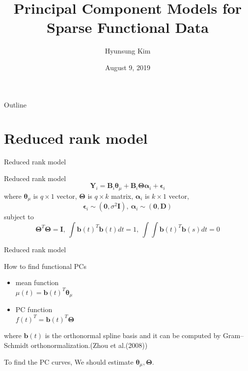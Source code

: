 \documentclass{beamer}
\title{Principal Component Models for Sparse Functional Data}
\date[Short Occasion]{August 9, 2019}
\author{Hyunsung Kim}
\institute{Department of Statistics\\ Chung-Ang University}
\subtitle{}
\def \bY {\mathbf{Y}}
\def \btheta {\boldsymbol{\theta}}
\def \bTheta {\boldsymbol{\Theta}}
\def \bepsilon {\boldsymbol{\epsilon}}
\def \balpha {\boldsymbol{\alpha}}
\begin{document}
\begin{frame}
  \titlepage
\end{frame}

\begin{frame}{Outline}
  \tableofcontents
\end{frame}

\section{Reduced rank model}
\begin{frame}{Reduced rank model}
	\begin{block}{Reduced rank model}
	\vspace{0.1cm}
	$$ \bY_i=\mathbf{B}_i\btheta_{\mu}+\mathbf{B}_i\bTheta\balpha_i + \bepsilon_i $$
	where $\btheta_{\mu}$ is $q \times 1$ vector, $\bTheta$ is $ q \times k$ matrix, $\balpha_i$ is $k \times 1$ vector,
	$$ \bepsilon_i \sim (\mathbf{0}, \sigma^2 \mathbf{I}), \ \balpha_i \sim (\mathbf{0}, \mathbf{D}) $$
	subject to
	$$ \bTheta^T \bTheta=\mathbf{I}, \ \int \mathbf{b}(t)^T\mathbf{b}(t)dt=1, \ \int\int \mathbf{b}(t)^T\mathbf{b}(s)dt=0 $$
	\end{block}
	
\end{frame}

\begin{frame}{Reduced rank model}
	\begin{block}{How to find functional PCs}
		\vspace{0.1cm}
		\begin{itemize}
			\item {
				mean function\\
				$\mu(t)=\mathbf{b}(t)^T\btheta_{\mu}$
			}
			\item {
				PC function\\
				$f(t)^T=\mathbf{b}(t)^T\bTheta$
			}
		\end{itemize}
		where $\mathbf{b}(t)$ is the orthonormal spline basis and it can be computed by Gram–Schmidt orthonormalization.(Zhou et al.(2008))
	\end{block}
	
	To find the PC curves, We should estimate $\btheta_{\mu}, \bTheta$.
\end{frame}
\end{document}
